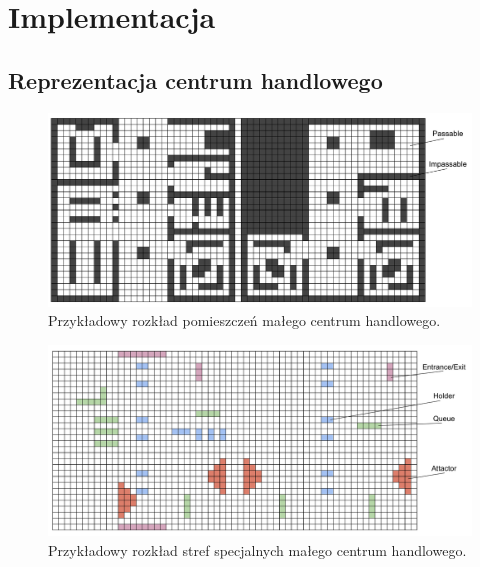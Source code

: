 \documentclass[a4paper, 12pt]{article}
\begin{document}
\newpage
    \section{Implementacja}
    \label{sec:implementation}


        \subsection{Reprezentacja centrum handlowego}
        \label{sec:mall-impl}

        \begin{figure}[h!]
            \centering
            \includegraphics[scale=0.2]{./img/MallLayout.pdf}
            \caption{Przykładowy rozkład pomieszczeń małego centrum handlowego.}
            \label{fig:mall-layout}
        \end{figure}

        \begin{figure}[h!]
            \centering
            \includegraphics[scale=0.2]{./img/MallFeatures.pdf}
            \caption{Przykładowy rozkład stref specjalnych małego centrum handlowego.}
            \label{fig:mall-features}
        \end{figure}
\end{document}
